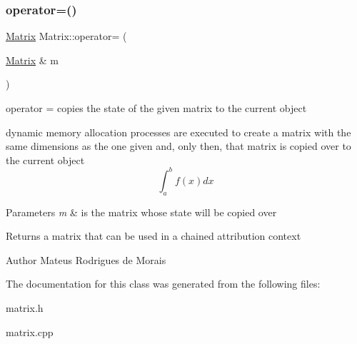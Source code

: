 \subsubsection{\texorpdfstring{operator=()}{operator=()}}
{\footnotesize\ttfamily \hyperlink{class_matrix}{Matrix} Matrix\+::operator= (\begin{DoxyParamCaption}\item[{\hyperlink{class_matrix}{Matrix} \&}]{m }\end{DoxyParamCaption})}



operator = copies the state of the given matrix to the current object 

dynamic memory allocation processes are executed to create a matrix with the same dimensions as the one given and, only then, that matrix is copied over to the current object \[ \int_a^b f(x) dx \] 
\begin{DoxyParams}{Parameters}
{\em m} & is the matrix whose state will be copied over \\
\hline
\end{DoxyParams}
\begin{DoxyReturn}{Returns}
a matrix that can be used in a chained attribution context 
\end{DoxyReturn}
\begin{DoxyAuthor}{Author}
Mateus Rodrigues de Morais 
\end{DoxyAuthor}


The documentation for this class was generated from the following files\+:\begin{DoxyCompactItemize}
\item 
matrix.\+h\item 
matrix.\+cpp\end{DoxyCompactItemize}
